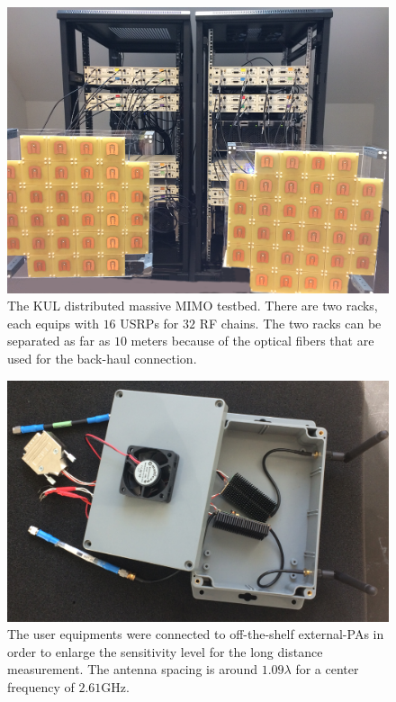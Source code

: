 \begin{figure}[t!]
	\centering
	\includegraphics[width=1\linewidth]{figures/MassiveMIMOv3.png}
	\caption{The KUL distributed massive MIMO testbed. There are two racks, each equips with $16$ USRPs for $32$ RF chains. The two racks can be separated as far as $10$ meters because of the optical fibers that  are used for the back-haul connection.}
	\label{fig:BSArrays}
\end{figure}
\begin{figure}[t!]
	\centering
	\includegraphics[width=1\linewidth]{figures/user_equipment.PNG}
	\caption{The user equipments were connected to off-the-shelf external-PAs in order to enlarge the sensitivity level for the long distance measurement. The antenna spacing is around $1.09\lambda$ for a center frequency of $2.61$GHz.}
	\label{fig:UserEquipment}
\end{figure}

